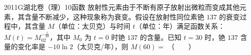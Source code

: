 
\begin{problem}{2011}{G}{湖北卷（理）}{10}{函数}
放射性元素由于不断有原子放射出微粒而变成其他元素，其含量不断减少，这种现象称为衰变。假设在放射性同位素铯 $137$ 的衰变过程中，其含量 $M$（单位：太贝克）与时间 $t$（单位：年）满足函数关系：$M(t)=M_02^{-\frac{t}{30}}$，其中 $M_0$ 为 $t=0$ 时铯 $137$ 的含量。已知 $t=30$ 时，铯 $137$ 含量的变化率是 $-10\ln2$（太贝克/年），则 $M(60)=$ \hspace{1cm}（　　）
\begin{choices}
\end{choices}
\end{problem}

\begin{answer}

\end{answer}

\begin{solutions}

\end{solutions}